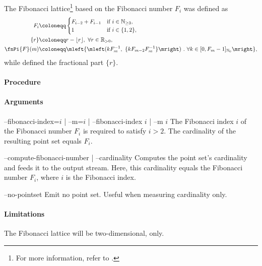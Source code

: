 
The Fibonacci lattice\footnote{For more information, refer to .} based on the Fibonacci number $F_i$ was defined as
\begin{align*}
  F_i &\coloneqq \begin{cases}
    F_{i-2} + F_{i-1} & \text{if}\ i \in \mathbb N_{\geq 3}, \\
    1 & \text{if}\ i \in \{1,2\},
  \end{cases}\\
  \{r\} &\coloneqq r - \lfloor r \rfloor,\ \forall r \in \mathbb R_{> 0}, \\
  \fnPi{F}(m) &\coloneqq \mleft\{ \mleft(k F_m^{-1},\ \{k F_{m-2} F_m^{-1}\} \mright)\ .\ \forall k \in [0,F_m-1]_{\mathbb N_0} \mright\},
\end{align*}
while  defined the fractional part $\{r\}$.

\paragraph{Procedure}

\begin{synopsis}
\end{synopsis}

\paragraph{Arguments}

\begin{procarg}{--fibonacci-index=$i$ | --m=$i$ | --fibonacci-index $i$ | --m $i$}
  The Fibonacci index $i$ of the Fibonacci number $F_i$ is required to satisfy $i > 2$. The cardinality of the resulting point set equals $F_i$.
\end{procarg}

\begin{procarg}{--compute-fibonacci-number | --cardinality}
  Computes the point set’s cardinality and feeds it to the output stream. Here, this cardinality equals the Fibonacci number $F_i$, where $i$ is the Fibonacci index.
\end{procarg}

\begin{procarg}{--no-pointset}
  Emit no point set. Useful when measuring cardinality only.
\end{procarg}

\procargout

\procargdelimiter

\procargsilent

\paragraph{Limitations}
The Fibonacci lattice will be two-dimensional, only.

